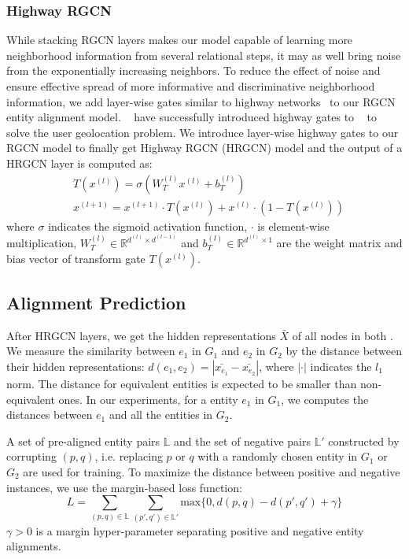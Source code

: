 	
	\subsubsection{Highway RGCN}
	\label{section:hgcn}
	While stacking RGCN layers makes our model capable of learning more neighborhood information from several relational steps, it may as well bring noise from the exponentially increasing neighbors. To reduce the effect of noise and ensure effective spread of more informative and discriminative neighborhood information, we add layer-wise gates similar to highway networks~\cite{Srivastava2015Highway} to our RGCN entity alignment model. ~\cite{Rahimi2018Semi} have successfully introduced highway gates to \GCNs~\cite{Kipf2016Semi} to solve the user geolocation problem. We introduce layer-wise highway gates to our RGCN model to finally get Highway RGCN (HRGCN) model and the output of a HRGCN layer is computed as:
	\begin{equation}
	\begin{split}
	&T(x^{(l)})=\sigma(W_T^{(l)}x^{(l)}+b_T^{(l)}) \\
	&x^{(l+1)}=x^{(l+1)} \cdot T(x^{(l)})+x^{(l)} \cdot (1-T(x^{(l)}))
	\end{split}
	\end{equation}
	where $\sigma$ indicates the sigmoid activation function, $\cdot$ is element-wise multiplication, $W_T^{(l)} \in \mathbb{R}^{d^{(l)} \times d^{(l-1)}}$ and $b_T^{(l)} \in \mathbb{R}^{d^{(l)} \times 1}$ are the weight matrix and bias vector of transform gate $T(x^{(l)})$.
	
	\subsection{Alignment Prediction}
	After HRGCN layers, we get the hidden representations $\bar{X}$ of all nodes in both \KGs. We measure the similarity between $e_1$ in $G_1$ and $e_2$ in $G_2$ by the distance between their hidden representations: $d(e_1,e_2)=|\bar{x_{e_1}}-\bar{x_{e_2}}|$, where $|\cdot|$ indicates the $l_1$ norm. The distance for equivalent entities is expected to be smaller than non-equivalent ones. In our experiments, for a entity $e_1$ in $G_1$, we computes the distances between $e_1$ and all the entities in $G_2$.
	
	A set of pre-aligned entity pairs $\mathbb{L}$ and the set of negative pairs $\mathbb{L'}$  constructed by corrupting $(p, q)$, i.e. replacing $p$ or $q$ with a randomly chosen entity in $G_1$ or $G_2$ are used for training. To maximize the distance between positive and negative instances, we use the margin-based loss function:
	\begin{equation}
	\label{d}
	L=\sum\limits_{(p,q)\in \mathbb{L}}\sum\limits_{(p',q')\in \mathbb{L'}}\mathrm{max}\{0,d(p,q)-d(p',q')+\gamma\}
	\end{equation}
	$\gamma > 0$ is a margin hyper-parameter separating positive and negative entity alignments.
	
